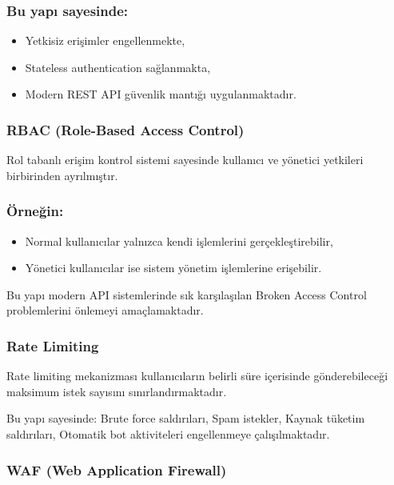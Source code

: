 \subsubsection{Bu yapı sayesinde:}

\begin{itemize}[leftmargin=*]
    \item Yetkisiz erişimler engellenmekte,
    \item Stateless authentication sağlanmakta,
    \item Modern REST API güvenlik mantığı uygulanmaktadır.
\end{itemize}

\subsubsection{RBAC (Role-Based Access Control)}

Rol tabanlı erişim kontrol sistemi sayesinde kullanıcı ve yönetici yetkileri birbirinden ayrılmıştır.

\subsubsection{Örneğin:}

\begin{itemize}[leftmargin=*]
    \item Normal kullanıcılar yalnızca kendi işlemlerini gerçekleştirebilir,
    \item Yönetici kullanıcılar ise sistem yönetim işlemlerine erişebilir.
\end{itemize}

Bu yapı modern API sistemlerinde sık karşılaşılan Broken Access Control problemlerini önlemeyi amaçlamaktadır.

\subsubsection{Rate Limiting}

Rate limiting mekanizması kullanıcıların belirli süre içerisinde gönderebileceği maksimum istek sayısını sınırlandırmaktadır.

Bu yapı sayesinde: Brute force saldırıları, Spam istekler, Kaynak tüketim saldırıları, Otomatik bot aktiviteleri engellenmeye çalışılmaktadır.

\subsubsection{WAF (Web Application Firewall)}

